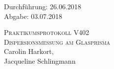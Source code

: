 

\begin{titlepage}
  \begin{flushleft}
 Durchführung: 26.06.2018\\
 Abgabe: 03.07.2018
  \end{flushleft}



 \begin{center}


\textsc{\LARGE Praktikumsprotokoll V402}\\[1.5cm]
\textsc{\huge Dispersionsmessung am Glasprisma} \\[5,5cm]

Carolin Harkort\footnotemark[1], \\
Jacqueline Schlingmann\footnotemark[2] \\[1,0cm]



 \end{center}

 \vfill

\end{titlepage}


  
  

\nocite{*}
\printbibliography

